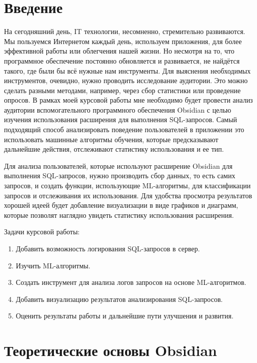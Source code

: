 \documentclass[14pt]{extarticle}
\begin{document}
\newpage
\section*{Введение}

На сегодняшний день, IT технологии, несомненно, стремительно развиваются. Мы пользуемся Интернетом каждый день, используем приложения, для более эффективной работы или облегчения нашей жизни. Но несмотря на то, что программное обеспечение постоянно обновляется и развивается, не найдётся такого, где были бы всё нужные нам инструменты. 
Для выяснения необходимых инструментов, очевидно, нужно проводить исследование аудитории. Это можно сделать разными методами, например, через сбор статистики или проведение опросов. В рамках моей курсовой работы мне необходимо будет провести анализ аудитории вспомогательного программного обеспечения Obsidian с целью изучения использования расширения для выполнения SQL-запросов. Самый подходящий способ анализировать поведение пользователей в приложении это использовать машинные алгоритмы обучения, которые предсказывают дальнейшие действия, отслеживают статистику использования и ее тип.

Для анализа пользователей, которые используют расширение Obsidian для выполнения SQL-запросов, нужно производить сбор данных, то есть самих запросов, и создать функции, использующие ML-алгоритмы, для классификации запросов и отслеживания их использования. Для удобства просмотра результатов хорошей идеей будет добавление визуализации в виде графиков и диаграмм, которые позволят наглядно увидеть статистику использования расширения.

\vspace{1em}
\noindent Задачи курсовой работы:
\begin{enumerate}
    \item Добавить возможность логирования SQL-запросов в сервер.
    \item Изучить ML-алгоритмы.
    \item Создать инструмент для анализа логов запросов на основе ML-алгоритмов.
    \item Добавить визуализацию результатов анализирования SQL-запросов.
    \item Оценить результаты работы и дальнейшие пути улучшения и развития.
\end{enumerate}

\newpage
\section{Теоретические основы Obsidian}
\end{document}
